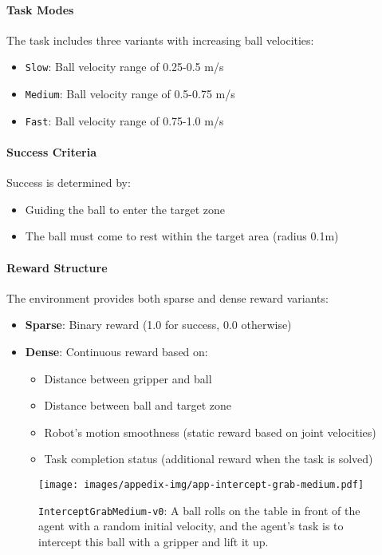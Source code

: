 \paragraph{Task Modes} The task includes three variants with increasing ball velocities:
\begin{itemize}
    \item \texttt{Slow}: Ball velocity range of 0.25-0.5 m/s
    \item \texttt{Medium}: Ball velocity range of 0.5-0.75 m/s
    \item \texttt{Fast}: Ball velocity range of 0.75-1.0 m/s
\end{itemize}

\paragraph{Success Criteria} Success is determined by:
\begin{itemize}
    \item Guiding the ball to enter the target zone
    \item The ball must come to rest within the target area (radius 0.1m)
\end{itemize}

\paragraph{Reward Structure} The environment provides both sparse and dense reward variants:
\begin{itemize}
    \item \textbf{Sparse}: Binary reward (1.0 for success, 0.0 otherwise)
    \item \textbf{Dense}: Continuous reward based on:
    \begin{itemize}
        \item Distance between gripper and ball
        \item Distance between ball and target zone
        \item Robot's motion smoothness (static reward based on joint velocities)
        \item Task completion status (additional reward when the task is solved)
    \end{itemize}
\end{itemize}


\newpage
\begin{figure*}[h!]
    \centering
    \texttt{[image: images/appedix-img/app-intercept-grab-medium.pdf]}
    \vspace{-15pt}
    \caption{\texttt{InterceptGrabMedium-v0}: A ball rolls on the table in front of the agent with a random initial velocity, and the agent's task is to intercept this ball with a gripper and lift it up.}
    \label{fig:app-intercept-grab-medium}
    \vspace{-15pt}
\end{figure*}
